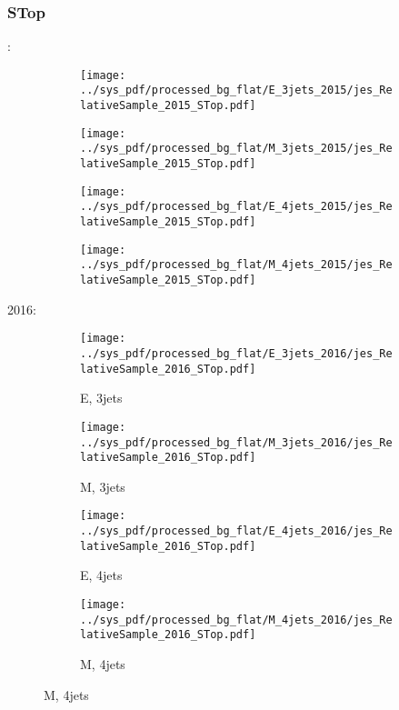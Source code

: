 \documentclass{beamer}
\begin{document}
\begin{frame}
\frametitle{STop}
\fontsize{5}{1}:
\begin{figure}
\centering
\begin{subfigure}[b]{0.24\textwidth}
\texttt{[image: ../sys\_pdf/processed\_bg\_flat/E\_3jets\_2015/jes\_RelativeSample\_2015\_STop.pdf]}
\end{subfigure}
\begin{subfigure}[b]{0.24\textwidth}
\texttt{[image: ../sys\_pdf/processed\_bg\_flat/M\_3jets\_2015/jes\_RelativeSample\_2015\_STop.pdf]}
\end{subfigure}
\begin{subfigure}[b]{0.24\textwidth}
\texttt{[image: ../sys\_pdf/processed\_bg\_flat/E\_4jets\_2015/jes\_RelativeSample\_2015\_STop.pdf]}
\end{subfigure}
\begin{subfigure}[b]{0.24\textwidth}
\texttt{[image: ../sys\_pdf/processed\_bg\_flat/M\_4jets\_2015/jes\_RelativeSample\_2015\_STop.pdf]}
\end{subfigure}
\end{figure}
2016:
\begin{figure}
\centering
\begin{subfigure}[b]{0.24\textwidth}
\texttt{[image: ../sys\_pdf/processed\_bg\_flat/E\_3jets\_2016/jes\_RelativeSample\_2016\_STop.pdf]}
\captionsetup{font=tiny}
\caption{E, 3jets}
\end{subfigure}
\begin{subfigure}[b]{0.24\textwidth}
\texttt{[image: ../sys\_pdf/processed\_bg\_flat/M\_3jets\_2016/jes\_RelativeSample\_2016\_STop.pdf]}
\captionsetup{font=tiny}
\caption{M, 3jets}
\end{subfigure}
\begin{subfigure}[b]{0.24\textwidth}
\texttt{[image: ../sys\_pdf/processed\_bg\_flat/E\_4jets\_2016/jes\_RelativeSample\_2016\_STop.pdf]}
\captionsetup{font=tiny}
\caption{E, 4jets}
\end{subfigure}
\begin{subfigure}[b]{0.24\textwidth}
\texttt{[image: ../sys\_pdf/processed\_bg\_flat/M\_4jets\_2016/jes\_RelativeSample\_2016\_STop.pdf]}
\captionsetup{font=tiny}
\caption{M, 4jets}
\end{subfigure}
\end{figure}
\end{frame}
\end{document}
